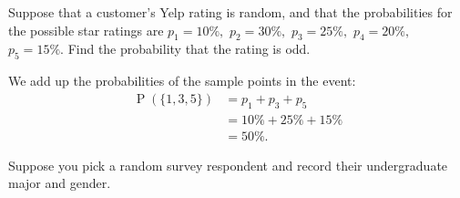 \documentclass[answers,11pt]{exam}
\DeclareMathOperator*{\Prob}{P}
\renewcommand{\Pr}{\Prob}
\begin{document}
\begin{questions}
\question Suppose that a customer's Yelp rating is random, and that the
probabilities for the possible star ratings are
\(
  p_1 = 10\%,
\)
\(
  p_2 = 30\%,
\)
\(
  p_3 = 25\%,
\)
\(
  p_4 = 20\%,
\)
\(
  p_5 = 15\%.
\)
Find the probability that the rating is odd.

\begin{solution}
We add up the probabilities of the sample points in the event:
\begin{align*}
  \Pr(\{1, 3, 5\})
    &= p_1 + p_3 + p_5 \\
    &= 10\% + 25\% + 15\% \\
    &= 50\%.
\end{align*}
\end{solution}



\newpage




\question Suppose you pick a random survey respondent and record their
undergraduate major and gender.  

\end{questions}
\end{document}
